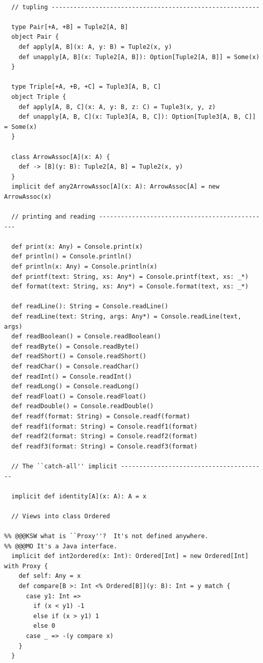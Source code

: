 \begin{lstlisting}

  // tupling ---------------------------------------------------------

  type Pair[+A, +B] = Tuple2[A, B]
  object Pair {
    def apply[A, B](x: A, y: B) = Tuple2(x, y)
    def unapply[A, B](x: Tuple2[A, B]): Option[Tuple2[A, B]] = Some(x)
  }

  type Triple[+A, +B, +C] = Tuple3[A, B, C]
  object Triple {
    def apply[A, B, C](x: A, y: B, z: C) = Tuple3(x, y, z)
    def unapply[A, B, C](x: Tuple3[A, B, C]): Option[Tuple3[A, B, C]] = Some(x)
  }

  class ArrowAssoc[A](x: A) {
    def -> [B](y: B): Tuple2[A, B] = Tuple2(x, y)
  }
  implicit def any2ArrowAssoc[A](x: A): ArrowAssoc[A] = new ArrowAssoc(x)

  // printing and reading -----------------------------------------------

  def print(x: Any) = Console.print(x)
  def println() = Console.println()
  def println(x: Any) = Console.println(x)
  def printf(text: String, xs: Any*) = Console.printf(text, xs: _*)
  def format(text: String, xs: Any*) = Console.format(text, xs: _*)

  def readLine(): String = Console.readLine()
  def readLine(text: String, args: Any*) = Console.readLine(text, args)
  def readBoolean() = Console.readBoolean()
  def readByte() = Console.readByte()
  def readShort() = Console.readShort()
  def readChar() = Console.readChar()
  def readInt() = Console.readInt()
  def readLong() = Console.readLong()
  def readFloat() = Console.readFloat()
  def readDouble() = Console.readDouble()
  def readf(format: String) = Console.readf(format)
  def readf1(format: String) = Console.readf1(format)
  def readf2(format: String) = Console.readf2(format)
  def readf3(format: String) = Console.readf3(format)
  
  // The ``catch-all'' implicit ----------------------------------------

  implicit def identity[A](x: A): A = x

  // Views into class Ordered

%% @@@KSW what is ``Proxy''?  It's not defined anywhere. 
%% @@@MO It's a Java interface.
  implicit def int2ordered(x: Int): Ordered[Int] = new Ordered[Int] with Proxy {
    def self: Any = x
    def compare[B >: Int <% Ordered[B]](y: B): Int = y match {
      case y1: Int =>
        if (x < y1) -1
        else if (x > y1) 1
        else 0
      case _ => -(y compare x)
    }
  }


\end{lstlisting}
